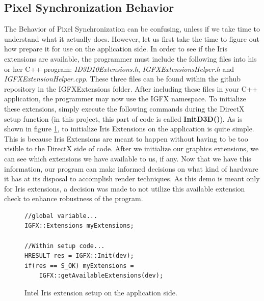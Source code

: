 \documentclass[a4paper, 12pt]{article}
\begin{document}
\subsection{Pixel Synchronization Behavior}

\label{section:PSBehavior}

The Behavior of Pixel Synchronization can be confusing, unless if we take time
to understand what it actually does. However, let us first take the time to
figure out how prepare it for use on the application side. In order to see if
the Iris extensions are available, the programmer must include the following
files into his or her C++ program: \textit{ID3D10Extensions.h},
\textit{IGFXExtensionsHelper.h} and \textit{IGFXExtensionHelper.cpp}. These
three files can be found within the github repository in the IGFXExtensions
folder. After including these files in your C++ application, the programmer
may now use the IGFX namespace. To initialize these extensions, simply execute
the following commands during the DirectX setup function (in this project,
this part of code is called \textbf{InitD3D()}). As is shown in figure
\ref{code:extInit}, to initialize Iris Extensions on the application is quite
simple. This is because Iris Extensions are meant to happen without having to
be too visible to the DirectX side of code. After we initialize our graphics
extensions, we can see which extensions we have available to us, if any. Now
that we have this information, our program can make informed decisions on what
kind of hardware it has at its disposal to accomplish render techniques. As
this demo is meant only for Iris extensions, a decision was made to not
utilize this available extension check to enhance robustness of the program.

\begin{figure}[h]
\begin{lstlisting}
//global variable...
IGFX::Extensions myExtensions;

//Within setup code...
HRESULT res = IGFX::Init(dev);
if(res == S_OK) myExtensions = 
	IGFX::getAvailableExtensions(dev);

\end{lstlisting}
\caption{Intel Iris extension setup on the application side.}
\label{code:extInit}
\end{figure}
\end{document}
